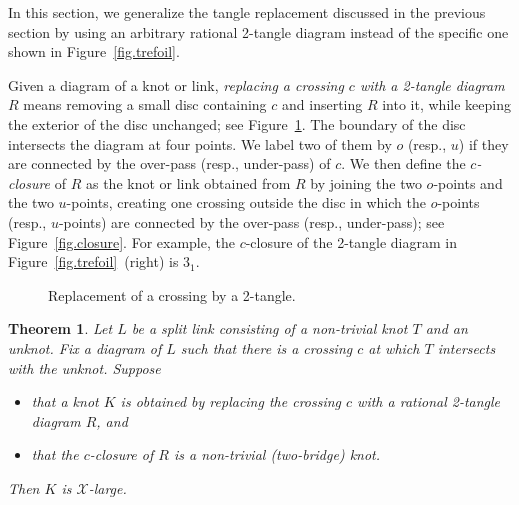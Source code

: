 \documentclass[12pt,reqno]{amsart}
\newtheorem{theorem}{Theorem}[section]
\theoremstyle{definition}
\def\calX{\mathcal X}
\begin{document}
In this section, we generalize the tangle replacement discussed in the previous section by using an arbitrary rational 2-tangle diagram instead of the specific one shown in Figure~\ref{fig.trefoil}.

Given a diagram of a knot or link, \emph{replacing a crossing $c$ with a 2-tangle diagram $R$} means removing a small disc containing $c$ and inserting $R$ into it, while keeping the exterior of the disc unchanged; see Figure~\ref{fig.replace}. The boundary of the disc intersects the diagram at four points. We label two of them by $o$ (resp., $u$) if they are connected by the over-pass (resp., under-pass) of $c$. We then define the \emph{$c$-closure} of $R$ as the knot or link obtained from $R$ by joining the two $o$-points and the two $u$-points, creating one crossing outside the disc in which the $o$-points (resp., $u$-points) are connected by the over-pass (resp., under-pass); see Figure~\ref{fig.closure}. For example, the $c$-closure of the 2-tangle diagram in Figure~\ref{fig.trefoil}~(right) is $3_1$.

\begin{figure}[!h]
    \centering
    
    \caption{Replacement of a crossing by a 2-tangle.}
    \label{fig.replace}
\end{figure}


\begin{theorem}
\label{thm.replace}
Let $L$ be a split link consisting of a non-trivial knot $T$ and an unknot. Fix a diagram of $L$ such that there is a crossing $c$ at which $T$ intersects with the unknot. Suppose 
\begin{itemize}
    \item that a knot $K$ is obtained by replacing the crossing $c$ with a rational 2-tangle diagram $R$, and
    \item that the $c$-closure of $R$ is a non-trivial (two-bridge) knot. 
\end{itemize}
Then $K$ is $\calX$-large.
\end{theorem}
\end{document}
